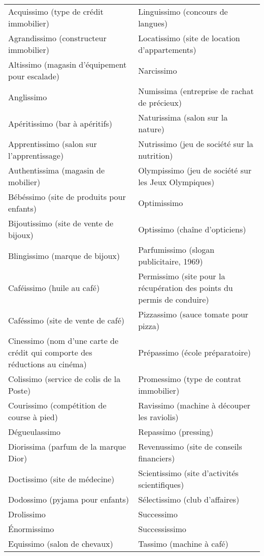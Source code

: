 \documentclass[output=paper]{langsci/langscibook}
\begin{document}
\begin{table}
\centering
\begin{tabularx}{\textwidth}{QQ}
\lsptoprule
Acquissimo (type de crédit immobilier)	&	Linguissimo (concours de langues)	\\
Agrandissimo (constructeur immobilier)	&	Locatissimo (site de location d'appartements)	\\
Altissimo (magasin d'équipement pour escalade)	&	Narcissimo	\\
Anglissimo	&	Numissima (entreprise de rachat de précieux)	\\
Apéritissimo (bar à apéritifs)	&	Naturissima (salon sur la nature)	\\
Apprentissimo (salon sur l'apprentissage)	&	Nutrissimo (jeu de société sur la nutrition)	\\
Authentissima (magasin de mobilier)	&	Olympissimo (jeu de société sur les Jeux Olympiques)	\\
Bébéssimo (site de produits pour enfants)	&	Optimissimo	\\
Bijoutissimo (site de vente de bijoux)	&	Optissimo (chaîne d'opticiens)	\\
Blingissimo (marque de bijoux)	&	Parfumissimo (slogan publicitaire, 1969)	\\
Caféissimo (huile au café)	&	Permissimo (site pour la récupération des points du permis de conduire)	\\
Caféssimo (site de vente de café)	&	Pizzassimo (sauce tomate pour pizza)	\\
Cinessimo (nom d'une carte de crédit qui comporte des réductions au cinéma)	&	Prépassimo (école préparatoire)	\\
Colissimo (service de colis de la Poste)	&	Promessimo (type de contrat immobilier)	\\
Courissimo (compétition de course à pied)	&	Ravissimo (machine à découper les raviolis)	\\
Dégueulassimo	&	Repassimo (pressing)	\\
Diorissima (parfum de la marque Dior)	&	Revenussimo (site de conseils financiers)	\\
Doctissimo (site de médecine)	&	Scientissimo (site d'activités scientifiques)	\\
Dodossimo (pyjama pour enfants)	&	Sélectissimo (club d'affaires)	\\
Drolissimo	&	Successimo	\\
Énormissimo	&	Successissimo	\\
Equissimo (salon de chevaux)	&	Tassimo (machine à café)	\\

\end{tabularx}
\end{table}
\end{document}
